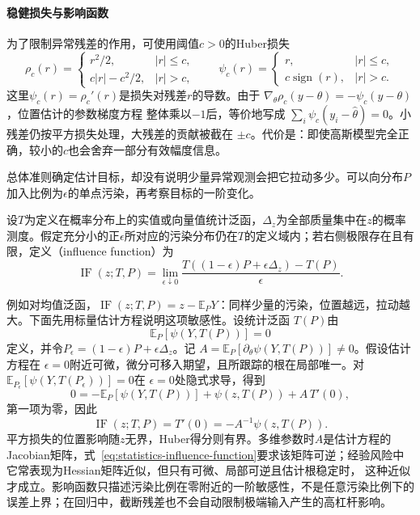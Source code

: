 \paragraph{稳健损失与影响函数}
为了限制异常残差的作用，可使用阈值\(c>0\)的Huber损失
\[
  \rho_c(r)=
  \begin{cases}
    r^2/2,& |r|\leq c,\\
    c|r|-c^2/2,& |r|>c,
  \end{cases}
  \qquad
  \psi_c(r)=
  \begin{cases}
    r,& |r|\leq c,\\
    c\operatorname{sign}(r),& |r|>c.
  \end{cases}
\]
这里\(\psi_c(r)=\rho_c'(r)\)是损失对残差\(r\)的导数。由于
\(\nabla_\theta\rho_c(y-\theta)=-\psi_c(y-\theta)\)，位置估计的参数梯度方程
整体乘以\(-1\)后，等价地写成
\(\sum_i\psi_c(y_i-\widehat\theta)=0\)。小残差仍按平方损失处理，大残差的贡献被截在
\(\pm c\)。代价是：即使高斯模型完全正确，较小的\(c\)也会舍弃一部分有效幅度信息。

总体准则确定估计目标，却没有说明少量异常观测会把它拉动多少。可以向分布\(P\)加入比例为\(\epsilon\)的单点污染，再考察目标的一阶变化。
\begin{definition}[影响函数]
  \label{def:statistics-influence-function}
  设\(T\)为定义在概率分布上的实值或向量值统计泛函，\(\Delta_z\)为全部质量集中在\(z\)的概率测度。假定充分小的正\(\epsilon\)所对应的污染分布仍在\(T\)的定义域内；若右侧极限存在且有限，定义（influence function）为
  \[ \operatorname{IF}(z;T,P)=\lim_{\epsilon\downarrow0}
    \frac{T((1-\epsilon)P+\epsilon\Delta_z)-T(P)}{\epsilon}. \]
\end{definition}
例如对均值泛函，\(\operatorname{IF}(z;T,P)=z-\mathbb E_PY\)：同样少量的污染，位置越远，拉动越大。下面先用标量估计方程说明这项敏感性。设统计泛函
\(T(P)\)由
\[
  \mathbb{E}_P[\psi(Y,T(P))]=0
\]
定义，并令\(P_\epsilon=(1-\epsilon)P+\epsilon\Delta_z\)。记
\(A=\mathbb{E}_P[\partial_\theta\psi(Y,T(P))]\neq0\)。假设估计方程在
\(\epsilon=0\)附近可微，微分可移入期望，且所跟踪的根在局部唯一。对
\(\mathbb{E}_{P_\epsilon}[\psi(Y,T(P_\epsilon))]=0\)在
\(\epsilon=0\)处隐式求导，得到
\[
  0=-\mathbb{E}_P[\psi(Y,T(P))]
    +\psi(z,T(P))+A\,T'(0),
\]
第一项为零，因此
\begin{equation}
  \operatorname{IF}(z;T,P)=T'(0)
  =-A^{-1}\psi(z,T(P)).
  \label{eq:statistics-influence-function}
\end{equation}
平方损失的位置影响随\(z\)无界，Huber得分则有界。多维参数时\(A\)是估计方程的
Jacobian矩阵，式~\eqref{eq:statistics-influence-function}要求该矩阵可逆；经验风险中它常表现为Hessian矩阵近似，但只有可微、局部可逆且估计根稳定时，
这种近似才成立。影响函数只描述污染比例在零附近的一阶敏感性，不是任意污染比例下的
误差上界；在回归中，截断残差也不会自动限制极端输入产生的高杠杆影响。

